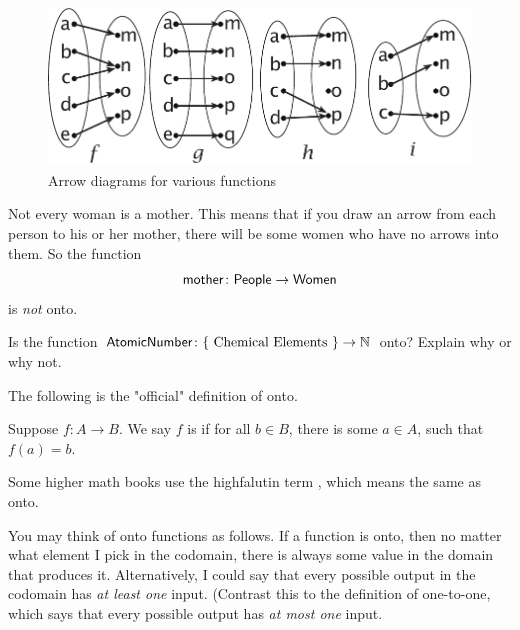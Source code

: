 \begin{center}
\begin{figure}[h]
\includegraphics[scale=0.6]{images/arrowonto.pdf}
\caption{Arrow diagrams for various functions}
\label{arrowontofig}
\end{figure}
\end{center}


\begin{example}{}
 Not every woman is a mother. 
This means that if you draw an arrow from each person to his or her mother, there will be some women who have no arrows into them. So the function 
\[ \sf{mother} \colon \sf{People} \to \sf{Women} \]
 is \emph{not} onto.
\end{example}

\begin{exercise}{}
Is the function $\sf{Atomic Number} \colon \{ \mbox{ Chemical Elements } \} \to \mathbb{N}$ onto?  Explain why or why not.
\end{exercise}

The following is the "official" definition  of onto.

\begin{defn}
Suppose $f \colon A \to B$. We say $f$ is  if for all $b \in B$, 
there is some $a \in A$, such that $f(a) = b$. 
\end{defn}

Some higher math books use the highfalutin term , which means the same as onto.

You may think of onto functions as follows. If a function is onto, then no matter what element I pick in the codomain, there is always some value in the domain that produces it. 
Alternatively, I could say that every possible output in the codomain has \emph{at least one} input.  (Contrast this to the definition of one-to-one, which says that every possible output has \emph{at most one} input.

